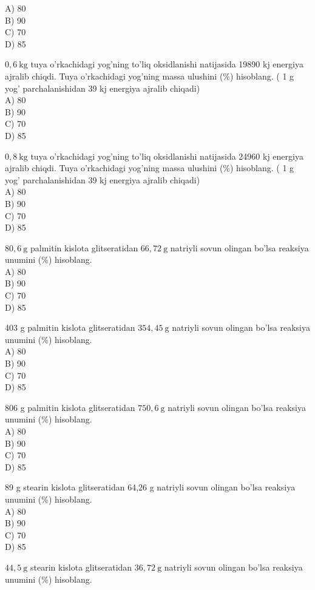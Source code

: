 A) 80\\
B) 90\\
C) 70\\
D) 85
  \item $0,6 \mathrm{~kg}$ tuya o'rkachidagi yog'ning to'liq oksidlanishi natijasida 19890 kj energiya ajralib chiqdi. Tuya o'rkachidagi yog'ning massa ulushini (\%) hisoblang. ( 1 g yog' parchalanishidan 39 kj energiya ajralib chiqadi)\\
A) 80\\
B) 90\\
C) 70\\
D) 85
  \item $0,8 \mathrm{~kg}$ tuya o'rkachidagi yog'ning to'liq oksidlanishi natijasida 24960 kj energiya ajralib chiqdi. Tuya o'rkachidagi yog'ning massa ulushini (\%) hisoblang. ( 1 g yog' parchalanishidan 39 kj energiya ajralib chiqadi)\\
A) 80\\
B) 90\\
C) 70\\
D) 85
  \item $80,6 \mathrm{~g}$ palmitin kislota glitseratidan $66,72 \mathrm{~g}$ natriyli sovun olingan bo'lsa reaksiya unumini (\%) hisoblang.\\
A) 80\\
B) 90\\
C) 70\\
D) 85
  \item 403 g palmitin kislota glitseratidan $354,45 \mathrm{~g}$ natriyli sovun olingan bo'lsa reaksiya unumini (\%) hisoblang.\\
A) 80\\
B) 90\\
C) 70\\
D) 85
  \item 806 g palmitin kislota glitseratidan $750,6 \mathrm{~g}$ natriyli sovun olingan bo'lsa reaksiya unumini (\%) hisoblang.\\
A) 80\\
B) 90\\
C) 70\\
D) 85
  \item 89 g stearin kislota glitseratidan 64,26 g natriyli sovun olingan bo'lsa reaksiya unumini (\%) hisoblang.\\
A) 80\\
B) 90\\
C) 70\\
D) 85
  \item $44,5 \mathrm{~g}$ stearin kislota glitseratidan $36,72 \mathrm{~g}$ natriyli sovun olingan bo'lsa reaksiya unumini (\%) hisoblang.\\
